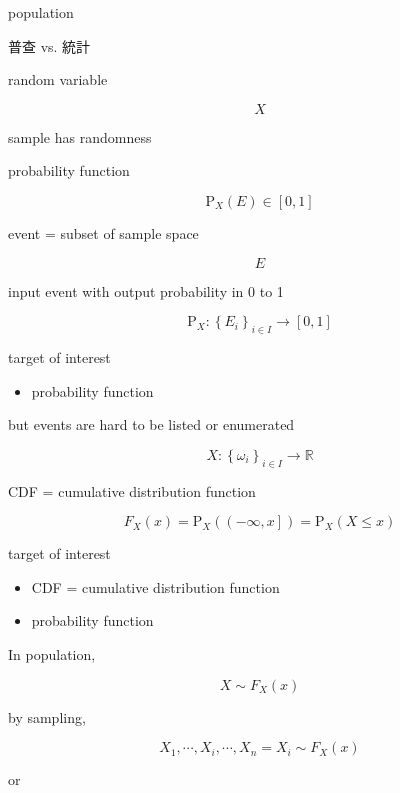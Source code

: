 \documentclass[
]{book}
\providecommand{\tightlist}{%
  \setlength{\itemsep}{0pt}\setlength{\parskip}{0pt}}
\theoremstyle{definition}
\theoremstyle{definition}
\theoremstyle{definition}
\theoremstyle{definition}
\theoremstyle{remark}
\begin{document}
population

\begin{CJK}{UTF8}{bsmi}
普查 vs. 統計
\end{CJK}

random variable

\[
X
\]

sample has randomness

probability function

\[
\mathrm{P}_{{\scriptscriptstyle X}}\left(E\right)\in\left[0,1\right]
\]

event = subset of sample space

\[
E
\]

input event with output probability in 0 to 1

\[
\mathrm{P}_{{\scriptscriptstyle X}}:\left\{ E_{{\scriptscriptstyle i}}\right\} _{{\scriptscriptstyle i\in I}}\rightarrow\left[0,1\right]
\]

target of interest

\begin{itemize}
\tightlist
\item
  probability function
\end{itemize}

but events are hard to be listed or enumerated

\[
X:\left\{ \omega_{{\scriptscriptstyle i}}\right\} _{{\scriptscriptstyle i}\in I}\rightarrow\mathbb{R}
\]

CDF = cumulative distribution function

\[
F_{{\scriptscriptstyle X}}\left(x\right)=\mathrm{P}_{{\scriptscriptstyle X}}\left(\left(-\infty,x\right]\right)=\mathrm{P}_{{\scriptscriptstyle X}}\left(X\le x\right)
\]

target of interest

\begin{itemize}
\tightlist
\item
  CDF = cumulative distribution function
\item
  probability function
\end{itemize}

In population,

\[
X\sim F_{{\scriptscriptstyle X}}\left(x\right)
\]

by sampling,

\[
X_{{\scriptscriptstyle 1}},\cdots,X_{{\scriptscriptstyle i}},\cdots,X_{{\scriptscriptstyle n}}=X_{{\scriptscriptstyle i}}\sim F_{{\scriptscriptstyle X}}\left(x\right)
\]

or
\end{document}
